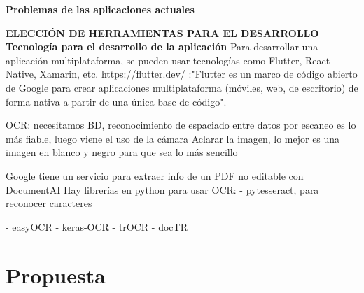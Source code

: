 \textbf{Problemas de las aplicaciones actuales}







\textbf{ELECCIÓN DE HERRAMIENTAS PARA EL DESARROLLO}
\textbf{Tecnología para el desarrollo de la aplicación}
Para desarrollar una aplicación multiplataforma, se pueden usar tecnologías como Flutter, React Native, Xamarin, etc.
https://flutter.dev/ :"Flutter es un marco de código abierto de Google para crear aplicaciones multiplataforma (móviles, 
web, de escritorio) de forma nativa a partir de una única base de código".


OCR:
necesitamos BD, reconocimiento de espaciado entre datos
por escaneo es lo más fiable, luego viene el uso de la cámara
Aclarar la imagen, lo mejor es una imagen en blanco y negro para que sea lo más sencillo

Google tiene un servicio para extraer info de un PDF no editable con DocumentAI
Hay librerías en python para usar OCR:
    - pytesseract, para reconocer caracteres 

- easyOCR
- keras-OCR
- trOCR
- docTR

\section{Propuesta}

